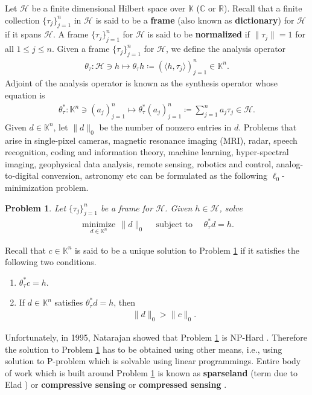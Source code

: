 \documentclass{amsart}
\newtheorem{problem}[theorem]{Problem}
\begin{document}
Let $\mathcal{H}$ be a  finite dimensional Hilbert  space over $\mathbb{K}$ ($\mathbb{C}$ or $\mathbb{R}$). Recall  \cite{BEDETTOFICKUS, HANKORNELSON} that a finite collection $\{\tau_j\}_{j=1}^n$ in $\mathcal{H}$ is said to be a \textbf{frame} (also known as \textbf{dictionary}) for $\mathcal{H}$ if it spans $\mathcal{H}$. A frame $\{\tau_j\}_{j=1}^n$ for  $\mathcal{H}$ is said to be \textbf{normalized} if $\|\tau_j\|=1$ for all $1\leq j \leq n$. Given a frame $\{\tau_j\}_{j=1}^n$ for  $\mathcal{H}$, we define the analysis operator
\begin{align*}
	\theta_\tau:\mathcal{H}\ni h \mapsto 	\theta_\tau h \coloneqq(\langle h,  \tau_j \rangle)_{j=1}^n \in \mathbb{K}^n.
\end{align*}
Adjoint of the analysis operator is known as  the synthesis operator whose equation is 
\begin{align*}
\theta_\tau^*: \mathbb{K}^n \ni (a_j)_{j=1}^n \mapsto \theta_\tau^*(a_j)_{j=1}^n\coloneqq\sum_{j=1}^{n}a_j\tau_j \in \mathcal{H}.
\end{align*}
Given $d\in \mathbb{K}^n$, let $\|d\|_0$ be the number of nonzero entries in $d$. Problems that arise in single-pixel cameras, magnetic resonance imaging (MRI), radar, speech recognition, coding and information theory, machine learning, hyper-spectral imaging, geophysical data analysis, remote sensing, robotics and control, analog-to-digital conversion, astronomy etc can be formulated as the following $\ell_0$-minimization problem.
\begin{problem} \label{P0}
 Let $\{\tau_j\}_{j=1}^n$ be a frame for  $\mathcal{H}$.  Given $h \in \mathcal{H}$, solve 	
\begin{align*}
	\underset{d\in \mathbb{K}^n}{\operatorname{minimize}}\,\|d\|_0\quad \text{ subject to } \quad \theta_\tau^*d=h.
\end{align*}
\end{problem}
Recall \cite{BEDETTOFICKUS, HANKORNELSON} that $c \in \mathbb{K}^n$ is said to be a unique solution to Problem \ref{P0}  if it satisfies the following two conditions.
\begin{enumerate}[\upshape(i)]
	\item $\theta_\tau^*c=h$.
	\item If $d \in \mathbb{K}^n$ satisfies $\theta_\tau^*d=h$, then 
\begin{align*}
	\|d\|_0>\|c\|_0.
\end{align*}
\end{enumerate}
Unfortunately, in 1995, Natarajan showed that Problem \ref{P0} is NP-Hard \cite{NATARAJAN, FOUCARTRAUHUT}. Therefore the solution to Problem \ref{P0} has to be obtained using other means, i.e., using solution to P-problem which is solvable using linear programmings. Entire body of work which is built around Problem \ref{P0} is known as \textbf{sparseland}  (term due to Elad \cite{ELAD}) or \textbf{compressive sensing} or \textbf{compressed sensing} \cite{VIDYASAGAR, ELAD, DAVENPORTDUARTEELDARKUTYNIOK, FOUCARTRAUHUT, KUTYNIOK2, DONOHO, ADCOCKHANSEN, RISHGRABARNIK, ELDARBOOK, TILLMANNPFETSCH, COHENDAHMENDEVORE, CANDESTAO2, CANDESTAO, CANDESTAO3, CANDESTAO4, CANDESROMBERGTAO, CANDES, CANDESROMBERGTAO2, FEUERNEMIROVSKI, GRIBONVALNIELSEN, DONOHOHUO, DONOHOELAD, ELADBRUCKSTEIN}.
\end{document}
